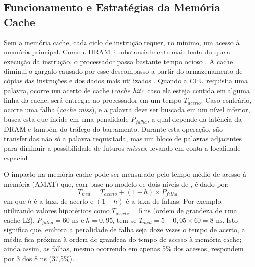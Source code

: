 \documentclass[portuguese]{sbcreviews-2025}%
\begin{document}
\subsection{Funcionamento e Estratégias da Memória Cache}
\label{sec:amat}

Sem a memória cache, cada ciclo de instrução requer, no mínimo, um acesso à memória principal. Como a DRAM é substancialmente mais lenta do que a execução da instrução, o processador passa bastante tempo ocioso 
\citep{ferreira2015}. A cache diminui o gargalo causado por esse descompasso a partir do armazenamento de cópias das instruções e dos dados mais utilizados \citep{stallings2010, ferreira2015}. Quando a CPU requisita 
uma palavra, ocorre um acerto de cache (\textit{cache hit}): caso ela esteja contida em alguma linha da cache, será entregue ao processador em um tempo $T_{acerto}$. Caso contrário, ocorre uma falha (\textit{cache miss}), 
e a palavra deve ser buscada em um nível inferior, busca esta que incide em uma penalidade $P_{falha}$, a qual depende da latência da DRAM e também do tráfego do barramento. Durante esta operação, são transferidas não só a palavra 
requisitada, mas um bloco de palavras adjacentes para diminuir a possibilidade de futuros \textit{misses}, levando em conta a localidade espacial \citep{stallings2010, ferreira2015}.

O impacto na memória cache pode ser mensurado pelo tempo médio de acesso à memória (AMAT) que, com base no modelo de dois níveis de \citep{stallings2010}, é dado por:
\begin{equation}\label{eq:amat}
T_{med} = T_{acerto} + (1 - h) \times P_{falha}
\end{equation}
em que $h$ é a taxa de acerto e $(1 - h)$ é a taxa de falhas. Por exemplo: utilizando valores hipotéticos como $T_{acerto} = 5\text{ ns}$ (ordem de grandeza de uma cache L2), $P_{falha} = 60\text{ ns}$ e $h = 0,95$, tem-se $T_{med} = 5 + 0,05 \times 60 = 8\text{ ns}$. 
Isto significa que, embora a penalidade de falha seja doze vezes o tempo de acerto, a média fica próxima à ordem de grandeza do tempo de acesso à memória cache; ainda assim, as falhas, mesmo ocorrendo em apenas 5\% dos acessos, respondem por 3 dos 8 ns (37,5\%).
\end{document}
